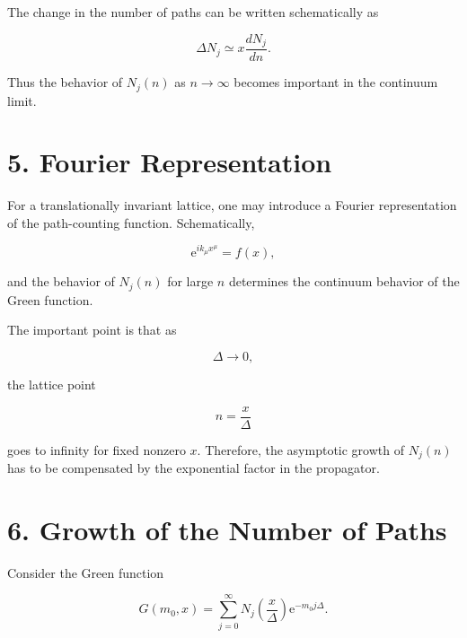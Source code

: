 \documentclass[12pt,a4paper]{article}
\newcommand{\ee}{\mathrm{e}}
\begin{document}
The change in the number of paths can be written schematically as

\begin{equation}
    \Delta N_j
    \simeq
    x\frac{dN_j}{dn}.
\end{equation}

Thus the behavior of $N_j(n)$ as $n\to\infty$ becomes important in
the continuum limit.


\section*{5. Fourier Representation}

For a translationally invariant lattice, one may introduce a Fourier
representation of the path-counting function. Schematically,

\begin{equation}
    \ee^{ik_\mu x^\mu}
    =
    f(x),
\end{equation}

and the behavior of $N_j(n)$ for large $n$ determines the continuum
behavior of the Green function.

The important point is that as

\begin{equation}
    \Delta\rightarrow0,
\end{equation}

the lattice point

\begin{equation}
    n=\frac{x}{\Delta}
\end{equation}

goes to infinity for fixed nonzero $x$. Therefore, the asymptotic
growth of $N_j(n)$ has to be compensated by the exponential factor
in the propagator.


\section*{6. Growth of the Number of Paths}

Consider the Green function

\begin{equation}
    \boxed{
    G(m_0,x)
    =
    \sum_{j=0}^{\infty}
    N_j\left(\frac{x}{\Delta}\right)
    \ee^{-m_0j\Delta}
    }.
\end{equation}
\end{document}

